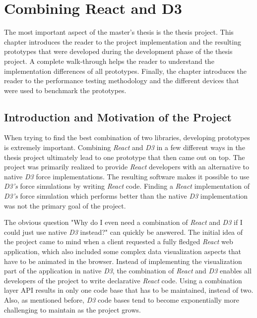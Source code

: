 \chapter{Combining React and D3}
\label{cha:visualization}

The most important aspect of the master's thesis is the thesis project. This chapter introduces the reader to the project implementation and the resulting prototypes that were developed during the development phase of the thesis project. A complete walk-through helps the reader to understand the implementation differences of all prototypes. Finally, the chapter introduces the reader to the performance testing methodology and the different devices that were used to benchmark the prototypes.

\section{Introduction and Motivation of the Project}

When trying to find the best combination of two libraries, developing prototypes is extremely important. Combining \emph{React} and \emph{D3} in a few different ways in the thesis project ultimately lead to one prototype that then came out on top. The project was primarily realized to provide \emph{React} developers with an alternative to native \emph{D3} force implementations. The resulting software makes it possible to use \emph{D3's} force simulations by writing \emph{React} code. Finding a \emph{React} implementation of \emph{D3's} force simulation which performs better than the native \emph{D3} implementation was not the primary goal of the project.

The obvious question "Why do I even need a combination of \emph{React} and \emph{D3} if I could just use native \emph{D3} instead?" can quickly be answered. The initial idea of the project came to mind when a client requested a fully fledged \emph{React} web application, which also included some complex data visualization aspects that have to be animated in the browser. Instead of implementing the visualization part of the application in native \emph{D3}, the combination of \emph{React} and \emph{D3} enables all developers of the project to write declarative \emph{React} code. Using a combination layer API results in only one code base that has to be maintained, instead of two. Also, as mentioned before, \emph{D3} code bases tend to become exponentially more challenging to maintain as the project grows.

